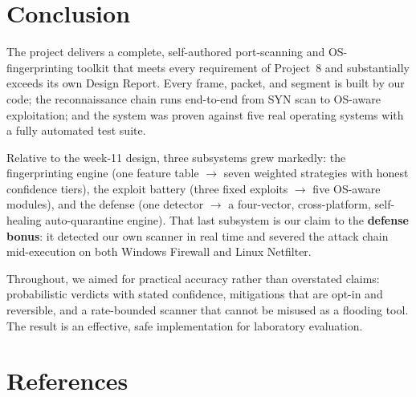 \section{Conclusion}

The project delivers a complete, self-authored port-scanning and OS-fingerprinting toolkit
that meets every requirement of Project~8 and substantially exceeds its own Design Report.
Every frame, packet, and segment is built by our code; the reconnaissance chain runs
end-to-end from SYN scan to OS-aware exploitation; and the system was proven against five
real operating systems with a fully automated test suite.

Relative to the week-11 design, three subsystems grew markedly: the fingerprinting engine
(one feature table $\rightarrow$ seven weighted strategies with honest confidence tiers),
the exploit battery (three fixed exploits $\rightarrow$ five OS-aware modules), and the
defense (one detector $\rightarrow$ a four-vector, cross-platform, self-healing
auto-quarantine engine). That last subsystem is our claim to the \textbf{defense bonus}: it
detected our own scanner in real time and severed the attack chain mid-execution on both
Windows Firewall and Linux Netfilter.

Throughout, we aimed for practical accuracy rather than overstated claims:
probabilistic verdicts with stated confidence, mitigations that are opt-in and reversible,
and a rate-bounded scanner that cannot be misused as a flooding tool. The result is an
effective, safe implementation for laboratory evaluation.

\section*{\sffamily\color{accent}References}

